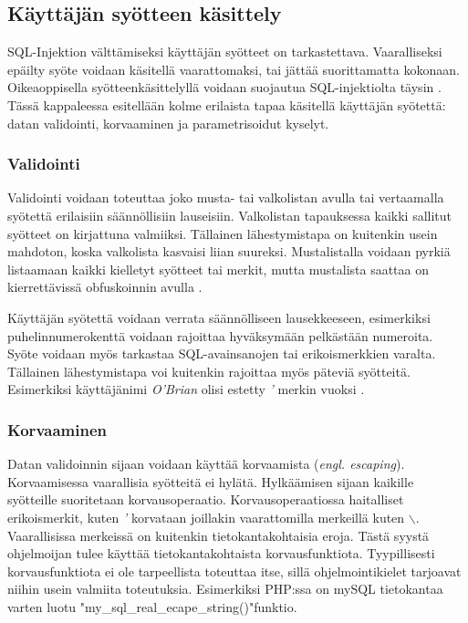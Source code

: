 \documentclass[finnish]{tktltiki2}
\theoremstyle{definition}
\theoremstyle{remark}
\begin{document}
	\subsection{Käyttäjän syötteen käsittely}
		SQL-Injektion välttämiseksi käyttäjän syötteet on tarkastettava. Vaaralliseksi epäilty syöte voidaan käsitellä vaarattomaksi, tai jättää suorittamatta kokonaan. Oikeaoppisella syötteenkäsittelyllä voidaan suojautua SQL-injektiolta täysin \cite{prepared}. Tässä kappaleessa esitellään kolme erilaista tapaa käsitellä käyttäjän syötettä: datan validointi, korvaaminen ja parametrisoidut kyselyt.
		
		 \subsubsection{Validointi}
		 Validointi voidaan toteuttaa joko musta- tai valkolistan avulla tai vertaamalla syötettä erilaisiin säännöllisiin lauseisiin. Valkolistan tapauksessa kaikki sallitut syötteet on kirjattuna valmiiksi. Tällainen lähestymistapa on kuitenkin usein mahdoton, koska valkolista kasvaisi liian suureksi. Mustalistalla voidaan pyrkiä listaamaan kaikki kielletyt syötteet tai merkit, mutta mustalista saattaa on kierrettävissä obfuskoinnin avulla \cite{encoding}. 
		
		Käyttäjän syötettä voidaan verrata säännölliseen lausekkeeseen, esimerkiksi puhelinnumerokenttä voidaan rajoittaa hyväksymään pelkästään numeroita. Syöte voidaan myös tarkastaa SQL-avainsanojen tai erikoismerkkien varalta. Tällainen lähestymistapa voi kuitenkin rajoittaa myös päteviä syötteitä. Esimerkiksi käyttäjänimi \textit{O'Brian} olisi estetty \textit{'} merkin vuoksi \cite{generation}.
		
		
		\subsubsection{Korvaaminen}
		Datan validoinnin sijaan voidaan käyttää korvaamista (\textit{engl. escaping}). Korvaamisessa vaarallisia syötteitä ei hylätä. Hylkäämisen sijaan kaikille syötteille suoritetaan korvausoperaatio. Korvausoperaatiossa haitalliset erikoismerkit, kuten \textit{'} korvataan joillakin vaarattomilla merkeillä kuten \textit{$\backslash$}. Vaarallisissa merkeissä on kuitenkin tietokantakohtaisia eroja. Tästä syystä ohjelmoijan tulee käyttää tietokantakohtaista korvausfunktiota. Tyypillisesti korvausfunktiota ei ole tarpeellista toteuttaa itse, sillä ohjelmointikielet tarjoavat niihin usein valmiita toteutuksia. Esimerkiksi PHP:ssa on mySQL tietokantaa varten luotu "my{\_}sql{\_}real{\_}ecape\_string()"\space funktio. 
		
\end{document}
